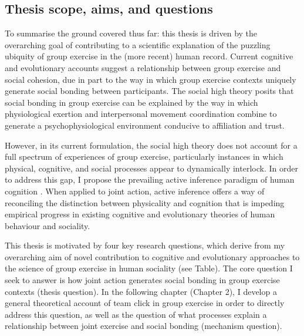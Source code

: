 \begin{CJK}{UTF8}{gbsn}
















\section{Thesis scope, aims, and questions}


To summarise the ground covered thus far: this thesis is driven by the overarching goal of contributing to a scientific explanation of the puzzling ubiquity of group exercise in the (more recent) human record. Current cognitive and evolutionary accounts suggest a relationship between group exercise and social cohesion, due in part to the way in which group exercise contexts uniquely generate social bonding between participants.  The social high theory posits that social bonding in group exercise can be explained by the way in which physiological exertion and interpersonal movement coordination combine to generate a psychophysiological environment conducive to affiliation and trust.

However, in its current formulation, the social high theory does not account for a full spectrum of experiences of group exercise, particularly instances in which physical, cognitive, and social processes appear to dynamically interlock. In order to address this gap, I propose the prevailing active inference paradigm of human cognition \citep{Friston2010}. When applied to joint action\citep{Friston2015,Friston2015a}, active inference offers a way of reconciling the distinction between physicality and cognition that is impeding empirical progress in existing cognitive and evolutionary theories of human behaviour and sociality.








This thesis is motivated by four key research questions, which derive from my overarching aim of novel contribution to cognitive and evolutionary approaches to the science of group exercise in human sociality  (see Table).  The core question I seek to answer is how joint action generates social bonding in group exercise contexts (thesis question). In the following chapter (Chapter 2), I develop a general theoretical account of team click in group exercise in order to directly address this question, as well as the question of what processes explain a relationship between joint exercise and social bonding (mechanism question).


\end{CJK}
